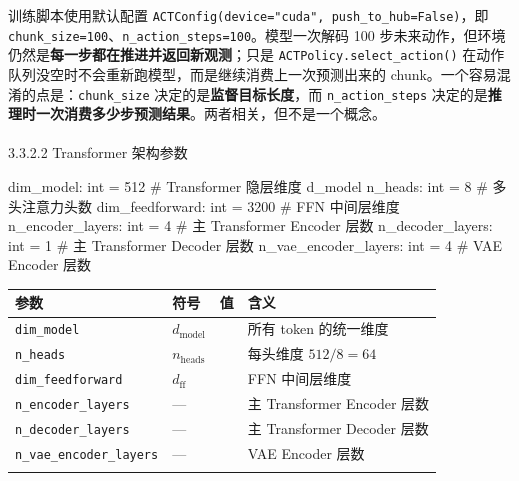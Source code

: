 \documentclass[
  chinese,
]{ctexart}
\makeatletter
\let\oldparagraph\paragraph
\renewcommand{\paragraph}{
    \@ifstar
      \xxxParagraphStar
      \xxxParagraphNoStar
  }
\newcommand{\xxxParagraphStar}[1]{\oldparagraph*{#1}\mbox{}}
\newcommand{\xxxParagraphNoStar}[1]{\oldparagraph{#1}\mbox{}}
\newenvironment{Shaded}{\begin{snugshade}}{\end{snugshade}}
\newcommand{\BuiltInTok}[1]{\textcolor[rgb]{0.00,0.23,0.31}{#1}}
\newcommand{\CommentTok}[1]{\textcolor[rgb]{0.37,0.37,0.37}{#1}}
\newcommand{\DecValTok}[1]{\textcolor[rgb]{0.68,0.00,0.00}{#1}}
\newcommand{\NormalTok}[1]{\textcolor[rgb]{0.00,0.23,0.31}{#1}}
\newcommand{\OperatorTok}[1]{\textcolor[rgb]{0.37,0.37,0.37}{#1}}
\makeatother
\begin{document}
训练脚本使用默认配置
\texttt{ACTConfig(device="cuda",\ push\_to\_hub=False)}，即
\texttt{chunk\_size=100}、\texttt{n\_action\_steps=100}。模型一次解码
100 步未来动作，但环境仍然是\textbf{每一步都在推进并返回新观测}；只是
\texttt{ACTPolicy.select\_action()}
在动作队列没空时不会重新跑模型，而是继续消费上一次预测出来的
chunk。一个容易混淆的点是：\texttt{chunk\_size}
决定的是\textbf{监督目标长度}，而 \texttt{n\_action\_steps}
决定的是\textbf{推理时一次消费多少步预测结果}。两者相关，但不是一个概念。

\paragraph{3.3.2.2 Transformer
架构参数}\label{transformer-ux67b6ux6784ux53c2ux6570}

\begin{Shaded}
\begin{Highlighting}[]
\NormalTok{dim\_model: }\BuiltInTok{int} \OperatorTok{=} \DecValTok{512}          \CommentTok{\# Transformer 隐层维度 d\_model}
\NormalTok{n\_heads: }\BuiltInTok{int} \OperatorTok{=} \DecValTok{8}              \CommentTok{\# 多头注意力头数}
\NormalTok{dim\_feedforward: }\BuiltInTok{int} \OperatorTok{=} \DecValTok{3200}   \CommentTok{\# FFN 中间层维度}
\NormalTok{n\_encoder\_layers: }\BuiltInTok{int} \OperatorTok{=} \DecValTok{4}     \CommentTok{\# 主 Transformer Encoder 层数}
\NormalTok{n\_decoder\_layers: }\BuiltInTok{int} \OperatorTok{=} \DecValTok{1}     \CommentTok{\# 主 Transformer Decoder 层数}
\NormalTok{n\_vae\_encoder\_layers: }\BuiltInTok{int} \OperatorTok{=} \DecValTok{4} \CommentTok{\# VAE Encoder 层数}
\end{Highlighting}
\end{Shaded}

\begin{center}
\begin{tabular}{@{}>{\raggedright\arraybackslash}p{} >{\raggedright\arraybackslash}p{} >{\raggedright\arraybackslash}p{} >{\raggedright\arraybackslash}p{}@{}}
\toprule\noalign{}
参数 & 符号 & 值 & 含义 \\
\midrule\noalign{}
\texttt{dim\_\allowbreak model} & \(d_{\text{model}}\) & 512 & 所有 token 的统一维度 \\
\texttt{n\_\allowbreak heads} & \(n_{\text{heads}}\) & 8 & 每头维度 \(512/8=64\) \\
\texttt{dim\_\allowbreak feedforward} & \(d_{\text{ff}}\) & 3200 & FFN 中间层维度 \\
\texttt{n\_\allowbreak encoder\_\allowbreak layers} & --- & 4 & 主 Transformer Encoder 层数 \\
\texttt{n\_\allowbreak decoder\_\allowbreak layers} & --- & 1 & 主 Transformer Decoder 层数 \\
\texttt{n\_\allowbreak vae\_\allowbreak encoder\_\allowbreak layers} & --- & 4 & VAE Encoder 层数 \\
\bottomrule\noalign{}
\end{tabular}
\end{center}
\end{document}
